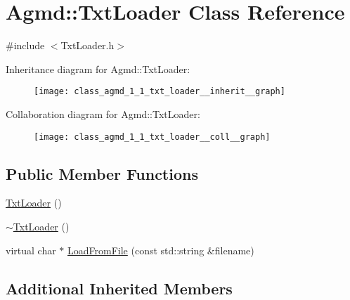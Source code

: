 \hypertarget{class_agmd_1_1_txt_loader}{\section{Agmd\+:\+:Txt\+Loader Class Reference}
\label{class_agmd_1_1_txt_loader}
}


{\ttfamily \#include $<$Txt\+Loader.\+h$>$}



Inheritance diagram for Agmd\+:\+:Txt\+Loader\+:\nopagebreak
\begin{figure}[H]
\begin{center}
\leavevmode
\texttt{[image: class\_agmd\_1\_1\_txt\_loader\_\_inherit\_\_graph]}
\end{center}
\end{figure}


Collaboration diagram for Agmd\+:\+:Txt\+Loader\+:\nopagebreak
\begin{figure}[H]
\begin{center}
\leavevmode
\texttt{[image: class\_agmd\_1\_1\_txt\_loader\_\_coll\_\_graph]}
\end{center}
\end{figure}
\subsection*{Public Member Functions}
\begin{DoxyCompactItemize}
\item 
\hyperlink{class_agmd_1_1_txt_loader_a215f643049e4ca16d77037892248a542}{Txt\+Loader} ()
\item 
\hyperlink{class_agmd_1_1_txt_loader_a58ac30306a947430f61a313b7835e456}{$\sim$\+Txt\+Loader} ()
\item 
virtual char $\ast$ \hyperlink{class_agmd_1_1_txt_loader_a264480c2f71a07184812c90158287403}{Load\+From\+File} (const std\+::string \&filename)
\end{DoxyCompactItemize}
\subsection*{Additional Inherited Members}


